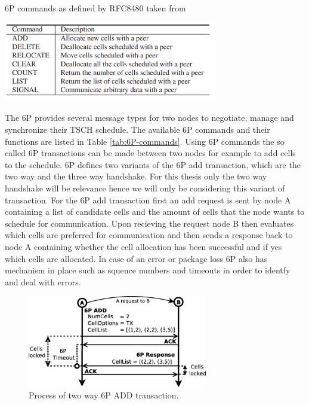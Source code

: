 \documentclass{comnets-thesis}
\begin{document}
\begin{table}
    \centering
    \caption{6P commands as defined by RFC8480 \cite{RFC8480} taken from \cite{sixpImplementationContiki}}
    \includegraphics[width=0.7\textwidth]{./images/sixp-commands.png}
    \label{tab:6P-commands}
\end{table}
The \ac{6P} provides several message types for two nodes to negotiate, manage and synchronize their \ac{TSCH} schedule. The available \ac{6P} commands and their functions are listed in Table \ref{tab:6P-commands}. Using \ac{6P} commands the so called \ac{6P} transactions can be made between two nodes for example to add cells to the schedule. \ac{6P} defines two variants of the \ac{6P} add transaction, which are the two way and the three way handshake. For this thesis only the two way handshake will be relevance hence we will only be considering this variant of transaction.
For the \ac{6P} add transaction first an add request is sent by node A containing a list of candidate cells and the amount of cells that the node wants to schedule for communication. Upon recieving the request node B then evaluates which cells are preferred for communication and then sends a response back to node A containing whether the cell allocation has been successful and if yes which cells are allocated.
In case of an error or package loss \ac{6P} also has mechanism in place such as squence numbers and timeouts in order to identfy and deal with errors.

\begin{figure}
    \centering
    \includegraphics[width=0.7\textwidth]{./images/sixp-add.png}
    \caption{Process of two way 6P ADD transaction. \cite{sixp-add-picture}}
    \label{fig:sixp-add}
\end{figure}
\end{document}
